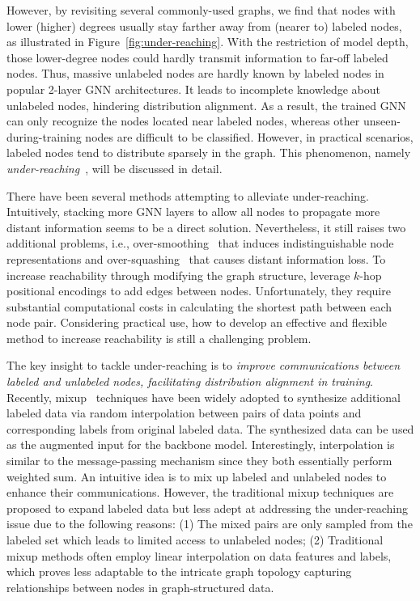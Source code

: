 \documentclass[letterpaper]{article} %
\begin{document}
However, by revisiting several commonly-used graphs, we find that nodes with lower (higher) degrees usually stay farther away from (nearer to) labeled nodes, as illustrated in Figure~\ref{fig:under-reaching}. With the restriction of model depth, those lower-degree nodes could hardly transmit information to far-off labeled nodes. Thus, massive unlabeled nodes are hardly known by labeled nodes in popular 2-layer GNN architectures. It leads to incomplete knowledge about unlabeled nodes, hindering distribution alignment. As a result, the trained GNN can only recognize the nodes located near labeled nodes, whereas other unseen-during-training nodes are difficult to be classified. However, in practical scenarios, labeled nodes tend to distribute sparsely in the graph. This phenomenon, namely \emph{under-reaching}~\cite{pastel, over, rewiring, under_reaching}, will be discussed in detail.

There have been several methods attempting to alleviate under-reaching. Intuitively, stacking more GNN layers to allow all nodes to propagate more distant information seems to be a direct solution. Nevertheless, it still raises two additional problems, i.e., over-smoothing~\cite{li2018deeper} that induces indistinguishable node representations and over-squashing~\cite{bottleneck} that causes distant information loss. To increase reachability through modifying the graph structure, \cite{pastel, rewiring} leverage $k$-hop positional encodings to add edges between nodes. Unfortunately, they require substantial computational costs in calculating the shortest path between each node pair. Considering practical use, how to develop an effective and flexible method to increase reachability is still a challenging problem.

The key insight to tackle under-reaching is to \emph{improve communications between labeled and unlabeled nodes, facilitating distribution alignment in training}. Recently, mixup~\cite{mixup,graphmixup,graphmix,mixup_for_node} techniques have been widely adopted to synthesize additional labeled data via random interpolation between pairs of data points and corresponding labels from original labeled data. The synthesized data can be used as the augmented input for the backbone model. Interestingly, interpolation is similar to the message-passing mechanism since they both essentially perform weighted sum. An intuitive idea is to mix up labeled and unlabeled nodes to enhance their communications. However, the traditional mixup techniques are proposed to expand labeled data but less adept at addressing the under-reaching issue due to the following reasons: (1) The mixed pairs are only sampled from the labeled set which leads to limited access to unlabeled nodes; (2) Traditional mixup methods often employ linear interpolation on data features and labels, which proves less adaptable to the intricate graph topology capturing relationships between nodes in graph-structured data.%
 
\end{document}
